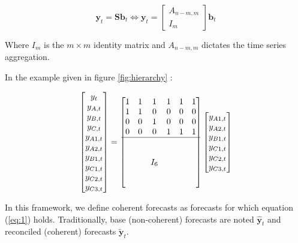 \documentclass[letterpaper]{article}
\begin{document}
\begin{equation}
    \mathbf{y}_t = \mathbf{Sb}_t  \Leftrightarrow   \mathbf{y}_t = \begin{bmatrix}
 A_{n-m,m} \\
 I_{m}
\end{bmatrix}\mathbf{b}_t
    \label{eq:1}
\end{equation}

Where $I_m$ is the $m \times m$ identity matrix and $A_{n-m,m}$ dictates the time series aggregation.

In the example given in figure \ref{fig:hierarchy} :

\begin{equation}
    \begin{bmatrix}
    y_{t} \\
    y_{A,t} \\
    y_{B,t} \\
    y_{C,t} \\
    y_{A1,t} \\
    y_{A2,t} \\
    y_{B1,t} \\
    y_{C1,t} \\
    y_{C2,t} \\
    y_{C3,t}
  \end{bmatrix}=
  \begin{bmatrix}
    1 & 1 & 1 & 1 & 1 & 1\\
    1 & 1 & 0 & 0 & 0 & 0\\
    0 & 0 & 1 & 0 & 0 & 0\\
    0 & 0 & 0 & 1 & 1 & 1\\
    \hline \\
    \\
    & &  I_6& & \\
    \\
    \\
  \end{bmatrix}
  \begin{bmatrix}
    y_{A1,t} \\
    y_{A2,t} \\
    y_{B1,t} \\
    y_{C1,t} \\
    y_{C2,t} \\
    y_{C3,t}
  \end{bmatrix}
\end{equation}

In this framework, we define coherent forecasts as forecasts for which equation (\ref{eq:1}) holds. 
Traditionally, base (non-coherent) forecasts are noted $\hat{\mathbf{y}}_t$ and reconciled (coherent) forecasts $\tilde{\mathbf{y}}_t$.
\end{document}
